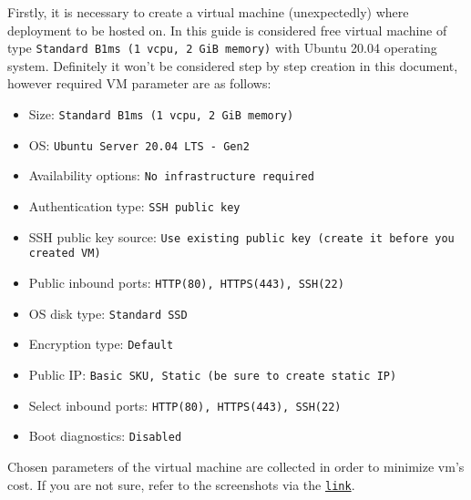 Firstly, it is necessary to create a virtual machine (unexpectedly) where deployment to be hosted on.
In this guide is considered free virtual machine of type \texttt{Standard B1ms (1 vcpu, 2 GiB memory)}
with Ubuntu 20.04 operating system.
Definitely it won't be considered step by step creation in this document, however required VM parameter are as follows:
\begin{itemize}
    \item Size: \texttt{Standard B1ms (1 vcpu, 2 GiB memory)}
    \item OS: \texttt{Ubuntu Server 20.04 LTS - Gen2}
    \item Availability options: \texttt{No infrastructure required}
    \item Authentication type: \texttt{SSH public key}
    \item SSH public key source: \texttt{Use existing public key (create it before you created VM)}
    \item Public inbound ports: \texttt{HTTP(80), HTTPS(443), SSH(22)}
    \item OS disk type: \texttt{Standard SSD}
    \item Encryption type: \texttt{Default}
    \item Public IP: \texttt{Basic SKU, Static (be sure to create static IP)}
    \item Select inbound ports: \texttt{HTTP(80), HTTPS(443), SSH(22)}
    \item Boot diagnostics: \texttt{Disabled}
\end{itemize}
Chosen parameters of the virtual machine are collected in order to minimize vm's cost.
If you are not sure, refer to the screenshots via the \href{url}{\texttt{link}}.